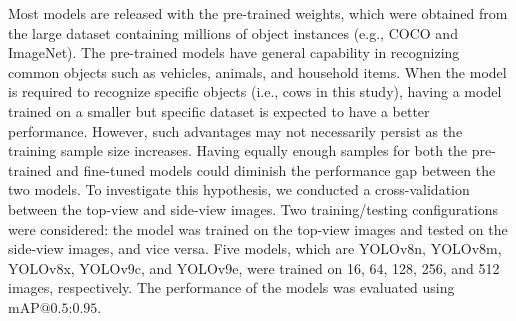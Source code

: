 Most models are released with the pre-trained weights, which were obtained from the large dataset containing millions of object instances (e.g., COCO\citep{} and ImageNet\citep{}). The pre-trained models have general capability in recognizing common objects such as vehicles, animals, and household items. When the model is required to recognize specific objects (i.e., cows in this study), having a model trained on a smaller but specific dataset is expected to have a better performance. However, such advantages may not necessarily persist as the training sample size increases. Having equally enough samples for both the pre-trained and fine-tuned models could diminish the performance gap between the two models. To investigate this hypothesis, we conducted a cross-validation between the top-view and side-view images. Two training/testing configurations were considered: the model was trained on the top-view images and tested on the side-view images, and vice versa. Five models, which are YOLOv8n, YOLOv8m, YOLOv8x, YOLOv9c, and YOLOv9e, were trained on 16, 64, 128, 256, and 512 images, respectively. The performance of the models was evaluated using $\text{mAP@{0.5:0.95}}$. 





